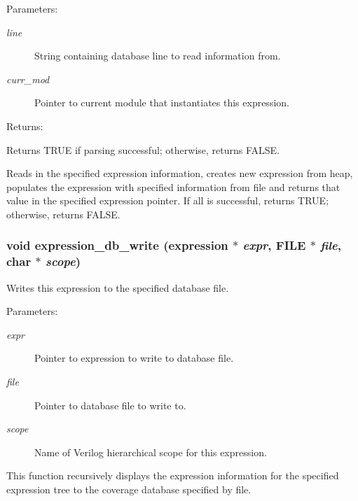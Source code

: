 \begin{Desc}
\item[Parameters: ]\par
\begin{description}
\item[{\em 
line}]String containing database line to read information from. \item[{\em 
curr\_\-mod}]Pointer to current module that instantiates this expression.\end{description}
\end{Desc}
\begin{Desc}
\item[Returns: ]\par
Returns TRUE if parsing successful; otherwise, returns FALSE.\end{Desc}
Reads in the specified expression information, creates new expression from heap, populates the expression with specified information from file and  returns that value in the specified expression pointer. If all is  successful, returns TRUE; otherwise, returns FALSE. 
\subsubsection{\setlength{\rightskip}{0pt plus 5cm}void expression\_\-db\_\-write ({\bf expression} $\ast$ {\em expr}, FILE $\ast$ {\em file}, char $\ast$ {\em scope})}\label{expr_8h_a3}


Writes this expression to the specified database file.

\begin{Desc}
\item[Parameters: ]\par
\begin{description}
\item[{\em 
expr}]Pointer to expression to write to database file. \item[{\em 
file}]Pointer to database file to write to. \item[{\em 
scope}]Name of Verilog hierarchical scope for this expression.\end{description}
\end{Desc}
This function recursively displays the expression information for the specified expression tree to the coverage database specified by file. 
